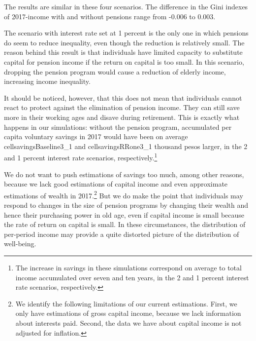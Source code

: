 \documentclass{article}
\newcommand{\cellsavingsBaseline}[2]{%
  \csname cellsavingsBaseline#1_#2\endcsname
}
\newcommand{\cellsavingsRRone}[2]{%
  \csname cellsavingsRRone#1_#2\endcsname
}
\begin{document}
The results are similar in these four scenarios. The difference in the Gini indexes of 2017-income with and without pensions range from -0.006 to 0.003. 

The scenario with interest rate set at 1 percent is the only one in which pensions do seem to reduce inequality, even though the reduction is relatively small. The reason behind this result is that individuals have limited capacity to substitute capital for pension income if the return on capital is too small. In this scenario, dropping the pension program would cause a reduction of elderly income, increasing income inequality. 

It should be noticed, however, that this does not mean that individuals cannot react to protect against the elimination of pension income. They can still save more in their working ages and disave during retirement. This is exactly what happens in our simulations: without the pension program, accumulated per capita voluntary savings in 2017 would have been on average \cellsavingsBaseline{3}{1}  and \cellsavingsRRone{3}{1}  thousand pesos larger, in the 2 and 1 percent interest rate scenarios, respectively.\footnote{The increase in savings in these simulations correspond on average to total income accumulated over seven and ten years, in the 2 and 1 percent interest rate scenarios, respectively.  }  

We do not want to push estimations of savings too much, among other reasons, because we lack good estimations of capital income and even approximate estimations of wealth in 2017.\footnote{We identify the following limitations of our current estimations. First, we only have estimations of gross capital income, because we lack information about interests paid. Second, the data we have about capital income is not adjusted for inflation.}  But we do make the point that individuals may respond to changes in the size of pension programs by changing their wealth and hence their purchasing power in old age, even if capital income is small  because the rate of return on capital is small. In these circumstances, the distribution of per-period income may provide a quite distorted picture of the distribution of well-being. 
\end{document}
